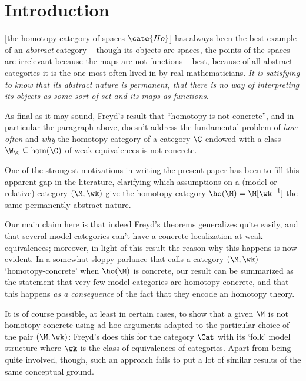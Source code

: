 \section{Introduction}
\begin{aquote}{\cite{fconc}}
[the homotopy category of spaces $\cate{Ho}$] has always been the best example
of an \emph{abstract} category -- though its objects are spaces, the points of
the spaces are irrelevant because the maps are not functions -- best, because of
all abstract categories it is the one most often lived in by real
mathematicians. \emph{It is satisfying to know that its abstract nature is
permanent, that there is no way of interpreting its objects as some sort of set
and its maps as functions.}
\end{aquote}
As final as it may sound, Freyd's result that ``homotopy is not concrete'', and
in particular the paragraph above, doesn't address the fundamental problem of
\emph{how often} and \emph{why} the homotopy category of a category $\C$ endowed
with a class $\W_\C \subseteq \hom(\C)$ of weak equivalences is not concrete.

One of the strongest motivations in writing the present paper has been to fill
this apparent gap in the literature, clarifying which assumptions on a (model or
relative) category $(\M, \wk)$ give the homotopy category $\ho(\M) =
\M[\wk^{-1}]$ the same permanently abstract nature.

Our main claim here is that indeed Freyd's theorems generalizes quite easily,
and that several model categories can't have a concrete localization at weak
equivalences; moreover, in light of this result the reason why this happens is
now evident. In a somewhat sloppy parlance that calls a category $(\M,\wk)$
`homotopy\hyp{}concrete' when $\ho(\M)$ is concrete, our result can be
summarized as the statement that very few model categories are
homotopy\hyp{}concrete, and that this happens \emph{as a consequence} of the
fact that they encode an homotopy theory.

It is of course possible, at least in certain cases, to show that a given $\M$
is not homotopy\hyp{}concrete using ad-hoc arguments adapted to the particular
choice of the pair $(\M, \wk)$: Freyd's \cite{fconc} does this for the category
$\Cat$ with its `folk' model structure where $\wk$ is the class of equivalences
of categories. Apart from being quite involved, though, such an approach fails
to put a lot of similar results of the same conceptual ground.

